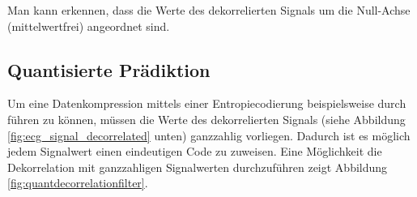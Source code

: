 \documentclass[
    10pt, %
    DIV12,
    english, %
    a5paper, %
    twoside, %
    titlepage, %
    parskip=half, %
    headings=small, %
    listof=totoc, %
    bibliography=totoc, %
    index=totoc, %
    captions=tableheading, %
    final %
]{scrbook}
\begin{document}
\noindent
Man kann erkennen, dass die Werte des dekorrelierten Signals um die Null-Achse (mittelwertfrei) angeordnet sind. 

\subsection{Quantisierte Prädiktion}
Um eine Datenkompression mittels einer Entropiecodierung beispielsweise durch führen zu können, müssen die Werte des dekorrelierten Signals (siehe Abbildung \ref{fig:ecg_signal_decorrelated} unten) ganzzahlig vorliegen. Dadurch ist es möglich jedem Signalwert einen eindeutigen Code zu zuweisen. Eine Möglichkeit die Dekorrelation mit ganzzahligen Signalwerten durchzuführen zeigt Abbildung \ref{fig:quantdecorrelationfilter}.

\begin{figure}[H]
\centering
{}
\end{figure}
\end{document}
